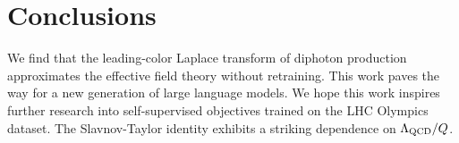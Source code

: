 \section{Conclusions}\label{sec:conclusions}

We find that the leading-color Laplace transform of diphoton production
approximates the effective field theory without retraining. This work
paves the way for a new generation of large language models. We hope
this work inspires further research into self-supervised objectives
trained on the LHC Olympics dataset. The Slavnov-Taylor identity
exhibits a striking dependence on $\Lambda_{\rm QCD}/Q$.

